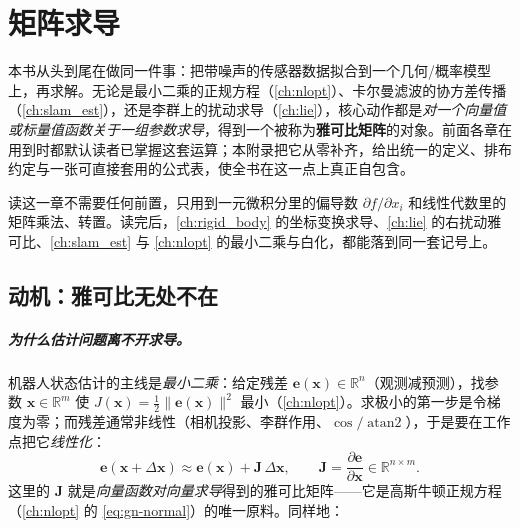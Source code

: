\chapter{矩阵求导}
\label{ch:matderiv}


本书从头到尾在做同一件事：把带噪声的传感器数据拟合到一个几何/概率模型上，再求解。无论是最小二乘的正规方程（\cref{ch:nlopt}）、卡尔曼滤波的协方差传播（\cref{ch:slam_est}），还是李群上的扰动求导（\cref{ch:lie}），核心动作都是\emph{对一个向量值或标量值函数关于一组参数求导}，得到一个被称为\textbf{雅可比矩阵}的对象。前面各章在用到时都默认读者已掌握这套运算；本附录把它从零补齐，给出统一的定义、排布约定与一张可直接套用的公式表，使全书在这一点上真正自包含。

读这一章不需要任何前置，只用到一元微积分里的偏导数 $\partial f/\partial x_i$ 和线性代数里的矩阵乘法、转置。读完后，\cref{ch:rigid_body} 的坐标变换求导、\cref{ch:lie} 的右扰动雅可比、\cref{ch:slam_est} 与 \cref{ch:nlopt} 的最小二乘与白化，都能落到同一套记号上。

\section{动机：雅可比无处不在}
\label{sec:matderiv-motiv}

\paragraph{为什么估计问题离不开求导。}
机器人状态估计的主线是\emph{最小二乘}：给定残差 $\mathbf{e}(\mathbf{x})\in\mathbb{R}^n$（观测减预测），找参数 $\mathbf{x}\in\mathbb{R}^m$ 使 $J(\mathbf{x})=\tfrac12\|\mathbf{e}(\mathbf{x})\|^2$ 最小（\cref{ch:nlopt}）。求极小的第一步是令梯度为零；而残差通常非线性（相机投影、李群作用、$\cos/\operatorname{atan2}$），于是要在工作点把它\emph{线性化}：
\begin{equation}
  \mathbf{e}(\mathbf{x}+\Delta\mathbf{x})\approx\mathbf{e}(\mathbf{x})+\mathbf{J}\,\Delta\mathbf{x},
  \qquad
  \mathbf{J}=\frac{\partial\mathbf{e}}{\partial\mathbf{x}}\in\mathbb{R}^{n\times m}.
  \label{eq:matderiv-linearize}
\end{equation}
这里的 $\mathbf{J}$ 就是\emph{向量函数对向量求导}得到的雅可比矩阵——它是高斯牛顿正规方程（\cref{ch:nlopt} 的 \cref{eq:gn-normal}）的唯一原料。同样地：


